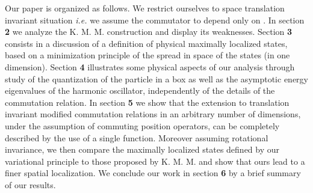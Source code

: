 \documentclass[a4paper,10pt]{article}
\providecommand{\p}{\mbox{\rm{\bf \^ p}}}
\providecommand{\KMM}{K. M. M. }
\begin{document}
Our paper is organized as follows. We restrict ourselves to space
translation invariant situation {\it i.e.} we assume the
commutator to depend only on \myHighlight{$\p$}\coordHE{}. In section {\bf 2} we analyze
the \KMM construction and display its weaknesses. Section {\bf 3}
consists in a discussion of a definition of physical maximally
localized states, based on a minimization principle of the spread
in space of the states (in one dimension). Section {\bf 4}
illustrates some physical aspects of our analysis through study of
the quantization of the particle in a box as well as the
asymptotic energy eigenvalues of the harmonic oscillator,
independently of the details of the commutation relation. In
section {\bf 5} we show that the extension to translation
invariant modified commutation relations in an arbitrary number of
dimensions, under the assumption of commuting position operators,
can be completely described by the use of a single function.
Moreover assuming rotational invariance, we then compare the
maximally localized states defined by our variational principle to
those proposed by \KMM and show that ours lead to a finer spatial
localization. We conclude our work in section {\bf 6} by a brief
summary of our results.
\end{document}
